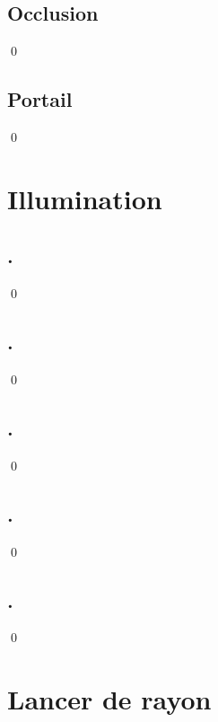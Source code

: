 \documentclass[12pt]{article}
\newcommand{\state}{\noindent}
\begin{document}
\subsection{Occlusion}

\state

\qed

\subsection{Portail}

\state

\qed

\pagebreak


\section{Illumination}

\subsection{.}

\state

\qed

\subsection{.}

\state

\qed

\subsection{.}

\state

\qed

\subsection{.}

\state

\qed

\subsection{.}

\state

\qed

\pagebreak

\section{Lancer de rayon}
\end{document}
